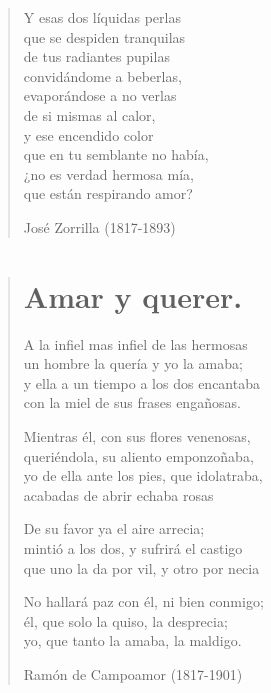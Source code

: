 \documentclass[12pt, twoside]{book}
\begin{document}
\begin{verse}
Y esas dos líquidas perlas\\
que se despiden tranquilas\\
de tus radiantes pupilas\\
convidándome a beberlas,\\
evaporándose a no verlas\\
de si mismas al calor,\\
y ese encendido color\\
que en tu semblante no había,\\
¿no es verdad hermosa mía,\\
que están respirando amor?

José Zorrilla (1817-1893)

\end{verse}

\newpage
\begin{verse}
\begin{center}
\section{Amar y querer.}
\end{center}
A la infiel mas infiel de las hermosas\\
un hombre la quería y yo la amaba;\\
y ella a un tiempo a los dos encantaba\\
con la miel de sus frases engañosas.
\newline

Mientras él, con sus flores venenosas,\\
queriéndola, su aliento emponzoñaba,\\
yo de ella ante los pies, que idolatraba,\\
acabadas de abrir echaba rosas
\newline

De su favor ya el aire arrecia;\\
mintió a los dos, y sufrirá el castigo\\
que uno la da por vil, y otro por necia
\newline

No hallará paz con él, ni bien conmigo;\\
él, que solo la quiso, la desprecia;\\
yo, que tanto la amaba, la maldigo.
\newline

Ramón de Campoamor (1817-1901)
\end{verse}
\end{document}
